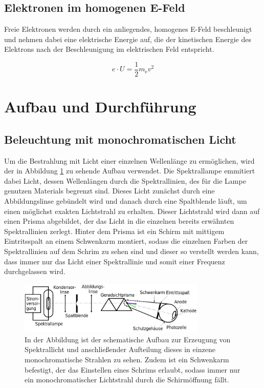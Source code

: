 \documentclass[titlepage = firstcover]{scrartcl}
\begin{document}
        \subsection{Elektronen im homogenen E-Feld}
        Freie Elektronen werden durch ein anliegendes, homogenes E-Feld beschleunigt und nehmen dabei eine elektrische Energie auf, die der kinetischen Energie des Elektrons nach der Beschleunigung
        im elektrischen Feld entspricht.

        \begin{equation}
            e \cdot U = \frac{1}{2} m_{\text{e}}v^2
            \label{eqn:Eel}
        \end{equation}

    \newpage
    \section{Aufbau und Durchführung}
        \subsection{Beleuchtung mit monochromatischen Licht}
            Um die Bestrahlung mit Licht einer einzelnen Wellenlänge zu ermöglichen, wird der in Abbildung \ref{fig:MonoLicht} zu sehende Aufbau verwendet. Die Spektrallampe emmitiert dabei Licht, dessen Wellenlängen 
            durch die Spektrallinien, des für die Lampe genutzen Materials begrenzt sind. Dieses Licht zunächst durch eine Abbildungslinse gebündelt wird und danach durch eine Spaltblende läuft, um 
            einen möglichst exakten Lichtstrahl zu erhalten. Dieser Lichtstrahl wird dann auf einen Prisma abgebildet, der das Licht in die einzelnen bereits erwähnten Spektrallinien zerlegt. Hinter 
            dem Prisma ist ein Schirm mit mittigem Eintritsspalt an einem Schwenkarm montiert, sodass die einzelnen Farben der Spektrallinien auf dem Schrim zu sehen sind und dieser so verstellt werden
            kann, dass immer nur das Licht einer Spektrallinie und somit einer Frequenz durchgelassen wird.
            
            \FloatBarrier

                \begin{figure}[h]
                  \centering
                  \includegraphics[width = 0.8\textwidth]{Bilder/Monolicht.png}
                  \caption{In der Abbildung ist der schematische Aufbau zur Erzeugung von Spektrallicht und anschließender Aufteilung dieses in einzene monochromatische Strahlen zu sehen. Zudem ist ein Schwenkarm befestigt, der das Einstellen eines Schrims erlaubt, sodass immer nur ein monochromatischer Lichtstrahl durch die Schirmöffnung fällt.}
                  \label{fig:MonoLicht}
                \end{figure}
\end{document}
